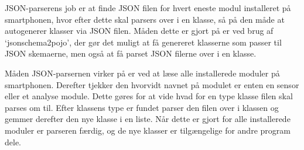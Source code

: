 JSON-parserens job er at finde JSON filen for hvert eneste modul installeret på smartphonen, hvor efter dette skal parsers over i en klasse, så på den måde at autogenerer klasser via JSON filen.
Måden dette er gjort på er ved brug af `jsonschema2pojo', der gør det muligt at få genereret klasserne som passer til JSON skemaerne, men også at få parset JSON filerne over i en klasse.

Måden JSON-parsernen virker på er ved at læse alle installerede moduler på smartphonen.
Derefter tjekker den hvorvidt navnet på modulet er enten en sensor eller et analyse module.
Dette gøres for at vide hvad for en type klasse filen skal parses om til.
Efter klassens type er fundet parser den filen over i klassen og gemmer derefter den nye klasse i en liste.
Når dette er gjort for alle installerede moduler er parseren færdig, og de nye klasser er tilgængelige for andre program dele.